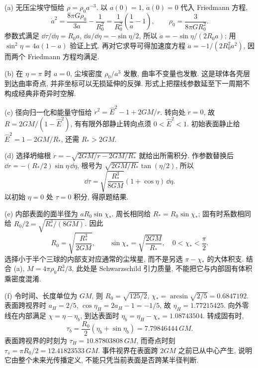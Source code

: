\begin{solution}
(a) 无压尘埃守恒给 $\rho=\rho_0a^{-3}$. 以 $a(0)=1$, $\dot a(0)=0$ 代入 Friedmann 方程,
\[
\dot a^2=\frac{8\pi G\rho_0}{3a}-\frac1{R_0^2}
=\frac1{R_0^2}\left(\frac1a-1\right),\qquad
\rho_0=\frac{3}{8\pi GR_0^2}.
\]
参数式满足 $\dd\tau/\dd\eta=R_0a$, $\dd a/\dd\eta=-\sin\eta/2$, 所以 $\dot a=-\sin\eta/(2R_0a)$; 用 $\sin^2\eta=4a(1-a)$ 验证上式. 再对它求导可得加速度方程 $\ddot a=-1/(2R_0^2a^2)$, 因而两个 Friedmann 方程均满足.

(b) 在 $\eta=\pi$ 时 $a=0$, 尘埃密度 $\rho_0/a^3$ 发散, 曲率不变量也发散. 这是球体各壳层到达曲率奇点, 并非坐标可以无损延伸的反弹. 形式上把摆线参数延至下一周期不构成经典非奇异时空解.

(c) 径向归一化和能量守恒给 $\dot r^2=\hat E^2-1+2GM/r$. 转向处 $\dot r=0$, 故 $R=2GM/(1-\hat E^2)$, 有有限外部静止转向点须 $0<\hat E^2<1$. 初始表面静止给 $\hat E^2=1-2GM/R_*$, 还需 $R_*>2GM$.

(d) 选择坍缩根 $\dot r=-\sqrt{2GM/r-2GM/R_*}$ 就给出所需积分. 作参数替换后 $\dd r=-(R_*/2)\sin\eta\,\dd\eta$, 根号为 $\sqrt{2GM/R_*}\tan(\eta/2)$, 所以
\[
\dd\tau=\sqrt{\frac{R_*^3}{8GM}}(1+\cos\eta)\,\dd\eta.
\]
以初始 $\eta=0$ 处 $\tau=0$ 积分, 得原题结果.

(e) 内部表面的面半径为 $aR_0\sin\chi_*$. 周长相同给 $R_*=R_0\sin\chi_*$; 固有时系数相同给 $R_0/2=\sqrt{R_*^3/(8GM)}$. 因此
\[
R_0=\sqrt{\frac{R_*^3}{2GM}},\qquad
\sin\chi_*=\sqrt{\frac{2GM}{R_*}},\quad 0<\chi_*<\frac\pi2.
\]
选择小于半个三球的内部支对应通常的尘埃星, 而不是另选 $\pi-\chi_*$ 的大体积支. 结合 (a), $M=4\pi\rho_0R_*^3/3$, 此处是 Schwarzschild 引力质量, 不能把它与内部固有体积乘密度混淆.

(f) 令时间、长度单位为 $GM$, 则 $R_0=\sqrt{125/2}$, $\chi_*=\arcsin\sqrt{2/5}=0.6847192$. 表面跨视界时 $a_H=2/5$, $\cos\eta_H=2a_H-1=-1/5$, 故 $\eta_H=1.77215425$. 向外零线在内部满足 $\chi=\eta-\eta_b$, 到达表面时 $\eta_b=\eta_H-\chi_*=1.08743504$. 转成固有时,
\[
\tau_b=\frac{R_0}{2}(\eta_b+\sin\eta_b)=7.79846444\,GM.
\]
表面跨视界的时刻为 $\tau_H=10.87803808\,GM$, 而奇点时刻 $\tau_s=\pi R_0/2=12.41823533\,GM$. 事件视界在表面跨 $2GM$ 之前已从中心产生, 说明它由整个未来光传播定义, 不能只凭当前表面是否跨某半径判断.


\end{solution}
